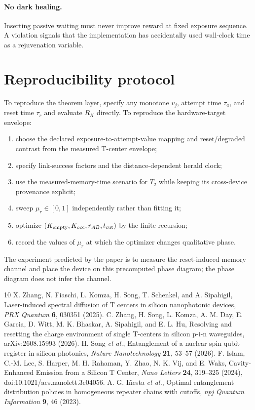 \documentclass[aps,prx,preprint,superscriptaddress,nofootinbib,longbibliography]{revtex4-2}
\begin{document}
\paragraph{No dark healing.} Inserting passive waiting must never improve reward at fixed exposure sequence. A violation signals that the implementation has accidentally used wall-clock time as a rejuvenation variable.

\section{Reproducibility protocol}
To reproduce the theorem layer, specify any monotone $v_j$, attempt time $\tau_a$, and reset time $\tau_r$ and evaluate $R_K$ directly. To reproduce the hardware-target envelope:
\begin{enumerate}
\item choose the declared exposure-to-attempt-value mapping and reset/degraded contrast from the measured T-center envelope;
\item specify link-success factors and the distance-dependent herald clock;
\item use the measured-memory-time scenario for $T_2$ while keeping its cross-device provenance explicit;
\item sweep $\mu_r\in[0,1]$ independently rather than fitting it;
\item optimize $(K_{\rm empty},K_{\rm occ},r_{AB},t_{\rm cut})$ by the finite recursion;
\item record the values of $\mu_r$ at which the optimizer changes qualitative phase.
\end{enumerate}
The experiment predicted by the paper is to measure the reset-induced memory channel and place the device on this precomputed phase diagram; the phase diagram does not infer the channel.

\begin{thebibliography}{10}
 X. Zhang, N. Fiaschi, L. Komza, H. Song, T. Schenkel, and A. Sipahigil, Laser-induced spectral diffusion of T centers in silicon nanophotonic devices, \emph{PRX Quantum} \textbf{6}, 030351 (2025).
 C. Zhang, H. Song, L. Komza, A. M. Day, E. Garcia, D. Witt, M. K. Bhaskar, A. Sipahigil, and E. L. Hu, Resolving and resetting the charge environment of single T-centers in silicon p-i-n waveguides, arXiv:2608.15993 (2026).
 H. Song \emph{et al.}, Entanglement of a nuclear spin qubit register in silicon photonics, \emph{Nature Nanotechnology} \textbf{21}, 53--57 (2026).
 F. Islam, C.-M. Lee, S. Harper, M. H. Rahaman, Y. Zhao, N. K. Vij, and E. Waks, Cavity-Enhanced Emission from a Silicon T Center, \emph{Nano Letters} \textbf{24}, 319--325 (2024), doi:10.1021/acs.nanolett.3c04056.
 A. G. I\~nesta \emph{et al.}, Optimal entanglement distribution policies in homogeneous repeater chains with cutoffs, \emph{npj Quantum Information} \textbf{9}, 46 (2023).
\end{thebibliography}
\end{document}
